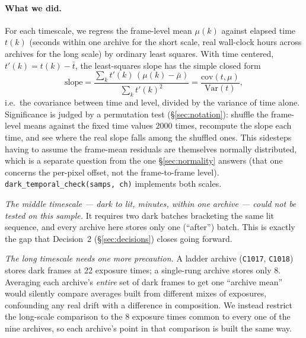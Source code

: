 \documentclass[11pt,a4paper]{article}
\newcommand{\code}[1]{\texttt{#1}}
\begin{document}
\paragraph{What we did.}
For each timescale, we regress the frame-level mean $\mu(k)$ against
elapsed time $t(k)$ (seconds within one archive for the short scale, real
wall-clock hours across archives for the long scale) by ordinary least
squares. With time centered, $t'(k) = t(k) - \bar t$, the least-squares
slope has the simple closed form
\[
\text{slope} = \frac{\sum_k t'(k)\,(\mu(k) - \bar\mu)}{\sum_k t'(k)^2}
= \frac{\mathrm{cov}(t, \mu)}{\mathrm{Var}(t)},
\]
i.e.\ the covariance between time and level, divided by the variance of
time alone. Significance is judged by a permutation test
(\S\ref{sec:notation}): shuffle the frame-level means against the fixed
time values $2000$ times, recompute the slope each time, and see where the
real slope falls among the shuffled ones. This sidesteps having to assume
the frame-mean residuals are themselves normally distributed, which is a
separate question from the one \S\ref{sec:normality} answers (that one
concerns the per-pixel offset, not the frame-to-frame level).
\code{dark\_temporal\_check(samps, ch)} implements both scales.

\emph{The middle timescale --- dark to lit, minutes, within one archive ---
could not be tested on this sample.} It requires two dark batches
bracketing the same lit sequence, and every archive here stores only one
(``after'') batch. This is exactly the gap that Decision~2
(\S\ref{sec:decisions}) closes going forward.

\emph{The long timescale needs one more precaution.} A ladder archive
(\code{C1017}, \code{C1018}) stores dark frames at 22 exposure times; a
single-rung archive stores only 8. Averaging each archive's \emph{entire}
set of dark frames to get one ``archive mean'' would silently compare
averages built from different mixes of exposures, confounding any real
drift with a difference in composition. We instead restrict the long-scale
comparison to the 8 exposure times common to every one of the nine
archives, so each archive's point in that comparison is built the same way.
\end{document}
